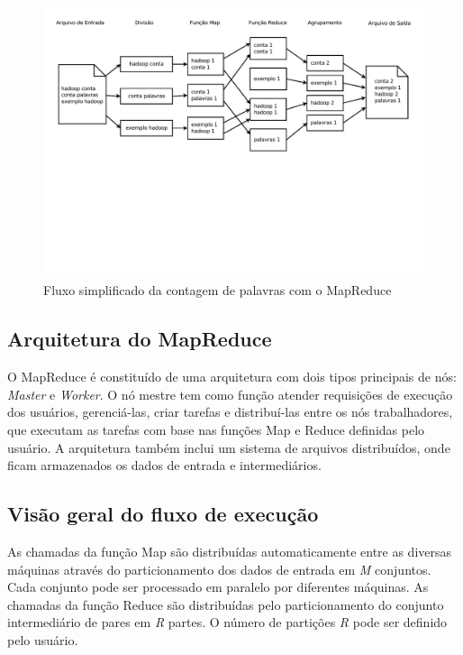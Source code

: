 \begin{figure}[htb]
\centering
\includegraphics[trim=0cm 9cm 0cm 1cm, width=\textwidth]{figuras/MapReduceExemplo.pdf}
\caption{Fluxo simplificado da contagem de palavras com o MapReduce}
\label{fig:MapReduceexemplo}
\end{figure}

\subsection{Arquitetura do MapReduce}
O MapReduce é constituído de uma arquitetura com dois tipos principais de nós: \textit{Master} e \textit{Worker}. O nó mestre tem como função atender requisições de execução dos usuários, gerenciá-las, criar tarefas e distribuí-las entre os nós trabalhadores, que executam as tarefas com base nas funções Map e Reduce definidas pelo usuário.
A arquitetura também inclui um sistema de arquivos distribuídos, onde ficam armazenados os dados de entrada e intermediários.



\subsection{Visão geral do fluxo de execução}


As chamadas da função Map são distribuídas automaticamente entre as diversas máquinas através do particionamento dos dados de entrada em \textit{M} conjuntos. Cada conjunto pode ser processado em paralelo por diferentes máquinas. As chamadas da função Reduce são distribuídas pelo particionamento do conjunto intermediário de pares em \textit{R} partes. O número de partições \textit{R} pode ser definido pelo usuário.

